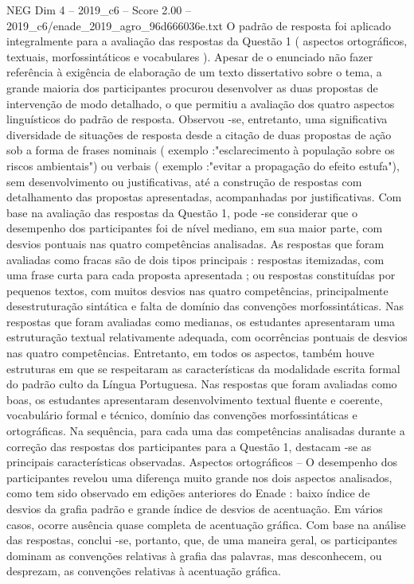 \begin{textsample}{NEG Dim 4 – 2019\_c6 – Score 2.00 – 2019\_c6/enade\_2019\_agro\_96d666036e.txt}
O padrão de resposta foi aplicado integralmente para a avaliação das respostas da Questão 1 ( aspectos ortográficos, textuais, morfossintáticos e vocabulares ).
Apesar de o enunciado não fazer referência à exigência de elaboração de um texto dissertativo sobre o tema, a grande maioria dos participantes procurou desenvolver as duas propostas de intervenção de modo detalhado, o que permitiu a avaliação dos quatro aspectos linguísticos do padrão de resposta.
Observou -se, entretanto, uma significativa diversidade de situações de resposta desde a citação de duas propostas de ação sob a forma de frases nominais ( exemplo :"esclarecimento à população sobre os riscos ambientais") ou verbais ( exemplo :"evitar a propagação do efeito estufa"), sem desenvolvimento ou justificativas, até a construção de respostas com detalhamento das propostas apresentadas, acompanhadas por justificativas.
Com base na avaliação das respostas da Questão 1, pode -se considerar que o desempenho dos participantes foi de nível mediano, em sua maior parte, com desvios pontuais nas quatro competências analisadas.
As respostas que foram avaliadas como fracas são de dois tipos principais : respostas itemizadas, com uma frase curta para cada proposta apresentada ; ou respostas constituídas por pequenos textos, com muitos desvios nas quatro competências, principalmente desestruturação sintática e falta de domínio das convenções morfossintáticas.
Nas respostas que foram avaliadas como medianas, os estudantes apresentaram uma estruturação textual relativamente adequada, com ocorrências pontuais de desvios nas quatro competências.
Entretanto, em todos os aspectos, também houve estruturas em que se respeitaram as características da modalidade escrita formal do padrão culto da Língua Portuguesa.
Nas respostas que foram avaliadas como boas, os estudantes apresentaram desenvolvimento textual fluente e coerente, vocabulário formal e técnico, domínio das convenções morfossintáticas e ortográficas.
Na sequência, para cada uma das competências analisadas durante a correção das respostas dos participantes para a Questão 1, destacam -se as principais características observadas.
Aspectos ortográficos – O desempenho dos participantes revelou uma diferença muito grande nos dois aspectos analisados, como tem sido observado em edições anteriores do Enade : baixo índice de desvios da grafia padrão e grande índice de desvios de acentuação.
Em vários casos, ocorre ausência quase completa de acentuação gráfica.
Com base na análise das respostas, conclui -se, portanto, que, de uma maneira geral, os participantes dominam as convenções relativas à grafia das palavras, mas desconhecem, ou desprezam, as convenções relativas à acentuação gráfica.

\end{textsample}
